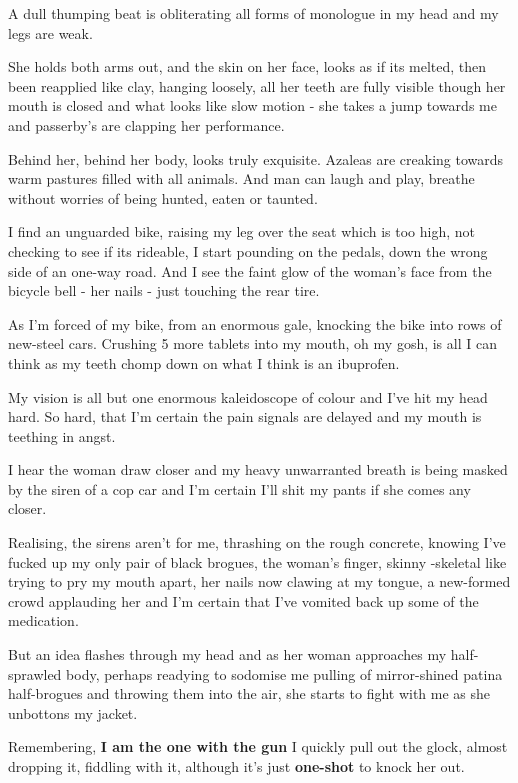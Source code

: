 \documentclass[19pt,openany]{book}
\begin{document}
A dull thumping beat
is obliterating all
forms of monologue in
my head and my legs
are weak.

She holds both arms out,
and the skin on her
face, looks as if its
melted, then been reapplied
like clay, hanging loosely,
all her teeth are fully
visible though her mouth is
closed and what looks like slow
motion - she takes a jump
towards me and passerby's
are clapping her performance.

Behind her, behind
her body, looks
truly exquisite.
Azaleas are
creaking towards warm
pastures filled
with all animals.
And man
can laugh and play,
breathe without worries
of being hunted, eaten or taunted.

I find an unguarded bike,
raising my leg over the
seat which is too high,
not checking to
see if its rideable,
I start pounding on the
pedals, down the wrong side
of an one-way road.
And I see the faint glow
of the woman's face from the
bicycle bell - her nails - just
touching the rear tire.

As I'm forced of my bike, from an enormous
gale, knocking the bike into rows of new-steel
cars. Crushing 5 more tablets into my mouth,
oh my gosh, is all I can think as my teeth
chomp down on what I think is an ibuprofen.

My vision is all but one
enormous kaleidoscope of colour
and I've hit my head hard. So
hard, that I'm certain the pain
signals are delayed and my mouth
is teething in angst.

I hear the woman draw
closer and my heavy unwarranted
breath is being masked by the siren
of a cop car and I'm certain I'll shit
my pants if she comes any closer.

Realising, the sirens aren't
for me, thrashing on the rough concrete,
knowing I've fucked up my only pair
of black brogues, the woman's finger,
skinny -skeletal like
trying to pry my mouth apart,
her nails now clawing at
my tongue, a new-formed crowd applauding
her and I'm certain that I've vomited
back up some of the medication.

But an idea flashes through my head and
as her woman approaches my half-sprawled body,
perhaps readying to sodomise me pulling of
mirror-shined patina half-brogues and throwing them
into the air, she starts to fight with me as she unbottons
my jacket.

Remembering, \textbf{I am the one
with the gun} I quickly pull out the glock,
almost dropping it, fiddling with it, although
it's just \textbf{one-shot} to knock her out.
\end{document}
